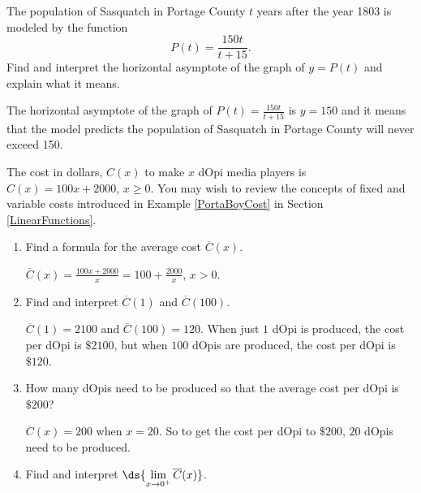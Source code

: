 \documentclass{ximera}
\begin{document}
\begin{problem}\label{squatchpop}
The population of Sasquatch in Portage County $t$ years after the year 1803 is modeled by the function \[P(t) = \frac{150t}{t + 15}.\] Find and interpret the horizontal asymptote of the graph of $y = P(t)$ and explain what it means.

\begin{solution}
     The horizontal asymptote of the graph of $P(t) = \frac{150t}{t + 15}$ is $y = 150$ and it means that the model predicts the population of Sasquatch in Portage County will never exceed 150.
\end{solution}
\end{problem}

\begin{problem}
The cost in dollars, $C(x)$ to make $x$ dOpi media players is $C(x) = 100x+2000$, $x \geq 0$.  You may wish to review the concepts of fixed and variable costs introduced in  Example \ref{PortaBoyCost} in Section \ref{LinearFunctions}.

\begin{enumerate}

\item  Find a formula for the average cost $\overline{C}(x)$.

\begin{solution}
    $\overline{C}(x) = \frac{100x+2000}{x} = 100 + \frac{2000}{x}$, $x > 0$.
\end{solution}

\item  Find and interpret $\overline{C}(1)$ and $\overline{C}(100)$.

\begin{solution}
     $\overline{C}(1) = 2100$ and $\overline{C}(100) = 120$. When just $1$ dOpi is produced, the cost per dOpi is $\$2100$, but when $100$ dOpis are produced, the cost per dOpi is $\$120$.
\end{solution}

\item  How many dOpis need to be produced so that the average cost per dOpi is $\$ 200$?

\begin{solution}
     $\overline{C}(x) = 200$ when $x = 20$.  So to get the cost per dOpi to $\$200$, $20$ dOpis need to be produced.
\end{solution}

\item  Find and interpret $\ds{ \lim_{x \rightarrow 0^{+}} \overline{C}(x)}$.


\end{enumerate}
\end{problem}
\end{document}

